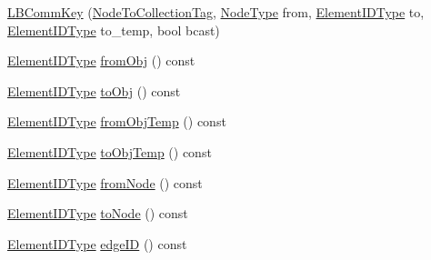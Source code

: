 \begin{DoxyCompactItemize}
\item 
\hyperlink{structvt_1_1vrt_1_1collection_1_1balance_1_1_l_b_comm_key_a2f9a95d4de4d824ba4dbdec5eb5317b7}{L\+B\+Comm\+Key} (\hyperlink{structvt_1_1vrt_1_1collection_1_1balance_1_1_l_b_comm_key_1_1_node_to_collection_tag}{Node\+To\+Collection\+Tag}, \hyperlink{namespacevt_a866da9d0efc19c0a1ce79e9e492f47e2}{Node\+Type} from, \hyperlink{namespacevt_1_1vrt_1_1collection_1_1balance_a14c8d2c972f2913aa3f1636e5be0a120}{Element\+I\+D\+Type} to, \hyperlink{namespacevt_1_1vrt_1_1collection_1_1balance_a14c8d2c972f2913aa3f1636e5be0a120}{Element\+I\+D\+Type} to\+\_\+temp, bool bcast)
\item 
\hyperlink{namespacevt_1_1vrt_1_1collection_1_1balance_a14c8d2c972f2913aa3f1636e5be0a120}{Element\+I\+D\+Type} \hyperlink{structvt_1_1vrt_1_1collection_1_1balance_1_1_l_b_comm_key_ae2e02eab3d0ec33e439713e26441cd6b}{from\+Obj} () const
\item 
\hyperlink{namespacevt_1_1vrt_1_1collection_1_1balance_a14c8d2c972f2913aa3f1636e5be0a120}{Element\+I\+D\+Type} \hyperlink{structvt_1_1vrt_1_1collection_1_1balance_1_1_l_b_comm_key_a56a3f51e34f36bb62423dd0c035b5971}{to\+Obj} () const
\item 
\hyperlink{namespacevt_1_1vrt_1_1collection_1_1balance_a14c8d2c972f2913aa3f1636e5be0a120}{Element\+I\+D\+Type} \hyperlink{structvt_1_1vrt_1_1collection_1_1balance_1_1_l_b_comm_key_ab8f8acdc0ff24784dfe4d6fafcc1205c}{from\+Obj\+Temp} () const
\item 
\hyperlink{namespacevt_1_1vrt_1_1collection_1_1balance_a14c8d2c972f2913aa3f1636e5be0a120}{Element\+I\+D\+Type} \hyperlink{structvt_1_1vrt_1_1collection_1_1balance_1_1_l_b_comm_key_a283c2e80183c3d37303f9b64a8097b66}{to\+Obj\+Temp} () const
\item 
\hyperlink{namespacevt_1_1vrt_1_1collection_1_1balance_a14c8d2c972f2913aa3f1636e5be0a120}{Element\+I\+D\+Type} \hyperlink{structvt_1_1vrt_1_1collection_1_1balance_1_1_l_b_comm_key_ae4d718ec81cafb4e830c5c9785baf070}{from\+Node} () const
\item 
\hyperlink{namespacevt_1_1vrt_1_1collection_1_1balance_a14c8d2c972f2913aa3f1636e5be0a120}{Element\+I\+D\+Type} \hyperlink{structvt_1_1vrt_1_1collection_1_1balance_1_1_l_b_comm_key_a159cf93a19b8a3fad2e4cfee94f96c83}{to\+Node} () const
\item 
\hyperlink{namespacevt_1_1vrt_1_1collection_1_1balance_a14c8d2c972f2913aa3f1636e5be0a120}{Element\+I\+D\+Type} \hyperlink{structvt_1_1vrt_1_1collection_1_1balance_1_1_l_b_comm_key_a3b7b746ea062d7e71c372e7c4028f71e}{edge\+ID} () const

\end{DoxyCompactItemize}
